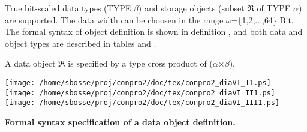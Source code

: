 \documentclass[a4paper,12pt,twoside,english]{article}
\begin{document}
\def\thesubsection{\tocXIV}
\secII{\label{toclabelXIV}\thesubsection}
True bit-scaled data types (TYPE $\beta$) and storage objects (subset $\Re$ of TYPE $\alpha$)  are
supported. The data width can be choosen in the range $\omega$=\{1,2,...,64\} Bit. The formal syntax of object definition is shown in definition , and both data and object types are described in tables  and . 


\vskip5pt
A data object $\Re$ is specified by a type cross product of ($\alpha$$\times$$\beta$). 


\vskip5pt
\def\defcontent{
\begin{center}
\texttt{[image: /home/sbosse/proj/conpro2/doc/tex/conpro2\_diaVI\_I1.ps]}\\\vskip3pt
\texttt{[image: /home/sbosse/proj/conpro2/doc/tex/conpro2\_diaVI\_II1.ps]}\\\vskip3pt
\texttt{[image: /home/sbosse/proj/conpro2/doc/tex/conpro2\_diaVI\_III1.ps]}\\\vskip3pt
\end{center}
}
\def\defdescription{
\caption{\bf Formal syntax specification of  a data object definition.
}
\label{def:6}}

\begin{definition}
\let\normalsize\footnotesize \normalsize
\defcontent
\defdescription

\end{definition}
\end{document}
